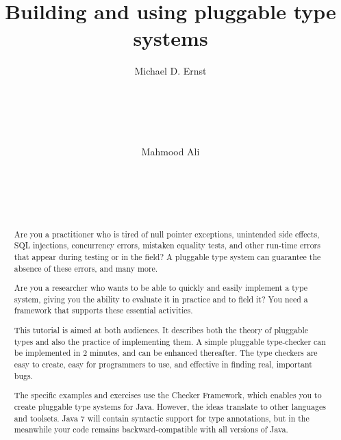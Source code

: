 \documentclass{sig-alternate} %
\begin{document}
%

\title{Building and using pluggable type systems}
\author{
\alignauthor
Michael D. Ernst\\
       \\
       \\
       \\
       \\
       \\
\alignauthor
Mahmood Ali\\
       \\
       \\
       \\
       \\
}

\maketitle
\begin{abstract}
Are you a practitioner who is tired of null pointer exceptions,
unintended side effects, SQL injections, concurrency errors, mistaken
equality tests, and other run-time errors that appear during testing or
in the field?  A pluggable type system can guarantee the absence of these
errors, and many more.

Are you a researcher who wants to be able to quickly and easily implement
a type system, giving you the ability to evaluate it in practice and to
field it?  You need a framework that supports these essential activities.

This tutorial is aimed at both audiences.  It describes both the theory
of pluggable types and also the practice of implementing them.  A simple
pluggable type-checker can be implemented in 2 minutes, and can be
enhanced thereafter.  The type checkers are easy to create, easy for
programmers to use, and effective in finding real, important bugs.

The specific examples and exercises use the Checker Framework, which
enables you to create pluggable type systems for Java.  However, the
ideas translate to other languages and toolsets.  Java 7 will contain
syntactic support for type annotations, but in the meanwhile your code
remains backward-compatible with all versions of Java.

\end{abstract}
\end{document}
